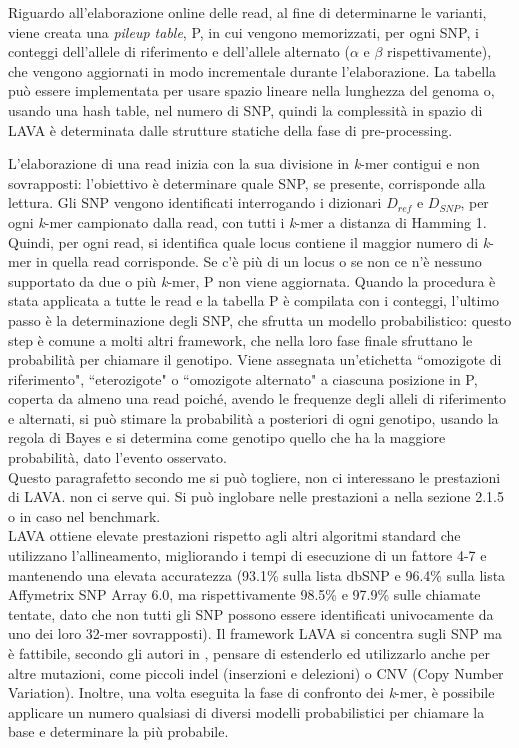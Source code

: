 \documentclass[../main.tex]{subfiles}
\begin{document}
\noindent
Riguardo all'elaborazione online delle read, al fine di determinarne le varianti, viene creata una \textit{pileup table}, P, in cui vengono memorizzati, per ogni SNP, i conteggi dell'allele di riferimento e dell'allele alternato ($\alpha$ e $\beta$ rispettivamente), che vengono aggiornati in modo incrementale durante l'elaborazione. La tabella può essere implementata per usare spazio lineare nella lunghezza del genoma o, usando una hash table, nel numero di SNP, quindi la complessità in spazio di LAVA è determinata dalle strutture statiche della fase di pre-processing.

L'elaborazione di una read inizia con la sua divisione in \textit{k}-mer contigui e non sovrapposti: l'obiettivo è determinare quale SNP, se presente, corrisponde alla lettura. Gli SNP vengono identificati interrogando i dizionari $D_{ref}$ e $D_{SNP}$, per ogni \textit{k}-mer campionato dalla read, con tutti i \textit{k}-mer a distanza di Hamming 1. Quindi, per ogni read, si identifica quale locus contiene il maggior numero di \textit{k}-mer in quella read corrisponde. Se c'è più di un locus o se non ce n'è nessuno supportato da due o più \textit{k}-mer, P non viene aggiornata. Quando la procedura è stata applicata a tutte le read e la tabella P è compilata con i conteggi, l'ultimo passo è la determinazione degli SNP, che sfrutta un modello probabilistico: questo step è comune a molti altri framework, che nella loro fase finale sfruttano le probabilità per chiamare il genotipo. Viene assegnata un'etichetta ``omozigote di riferimento", ``eterozigote" o ``omozigote alternato" a ciascuna posizione in P, coperta da almeno una read poiché, avendo le frequenze degli alleli di riferimento e alternati, si può stimare la probabilità a posteriori di ogni genotipo, usando la regola di Bayes e si determina come genotipo quello che ha la maggiore probabilità, dato l'evento osservato. \\

\textcolor{BurntOrange}{Questo paragrafetto secondo me si può togliere, non ci interessano le prestazioni di LAVA. non ci serve qui. Si può inglobare nelle prestazioni a nella sezione 2.1.5 o in caso nel benchmark.\\}
\noindent
LAVA ottiene elevate prestazioni rispetto agli altri algoritmi standard che utilizzano l'allineamento, migliorando i tempi di esecuzione di un fattore 4-7 e mantenendo una elevata accuratezza (93.1\% sulla lista dbSNP e 96.4\% sulla lista Affymetrix SNP Array 6.0, ma rispettivamente 98.5\% e 97.9\% sulle chiamate tentate, dato che non tutti gli SNP possono essere identificati univocamente da uno dei loro 32-mer sovrapposti).
Il framework LAVA si concentra sugli SNP ma è fattibile, secondo gli autori in  \cite{shajii2016lava}, pensare di estenderlo ed utilizzarlo anche per altre mutazioni, come piccoli indel (inserzioni e delezioni) o CNV (Copy Number Variation). Inoltre, una volta eseguita la fase di confronto dei \textit{k}-mer, è possibile applicare un numero qualsiasi di diversi modelli probabilistici per chiamare la base e determinare la più probabile. 
\end{document}
